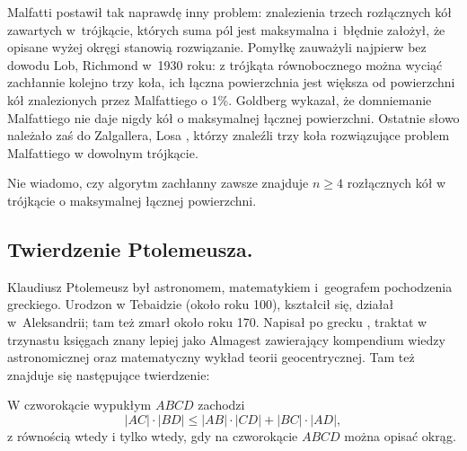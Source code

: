 Malfatti postawił tak naprawdę inny problem: znalezienia trzech rozłącznych kół zawartych w~trójkącie, których suma pól jest maksymalna i~błędnie założył, że opisane wyżej okręgi stanowią rozwiązanie.
Pomyłkę zauważyli najpierw bez dowodu Lob, Richmond \cite{lob_richmond_1930} w~1930 roku: z trójkąta równobocznego można wyciąć zachłannie kolejno trzy koła, ich łączna powierzchnia jest większa od powierzchni kół znalezionych przez Malfattiego o 1\%.
%
%
Goldberg \cite{goldberg_1967} wykazał, że domniemanie Malfattiego nie daje nigdy kół o maksymalnej łącznej powierzchni.
Ostatnie słowo należało zaś do Zalgallera, Losa \cite{zalgaller_los_1992}, którzy znaleźli trzy koła rozwiązujące problem Malfattiego w dowolnym trójkącie.
%
%

Nie wiadomo, czy algorytm zachłanny zawsze znajduje $n \ge 4$ rozłącznych kół w trójkącie o maksymalnej łącznej powierzchni.

%



%



%

\subsection{Twierdzenie Ptolemeusza.}
Klaudiusz Ptolemeusz był astronomem, matematykiem i~geografem pochodzenia greckiego.
Urodzon w Tebaidzie (około roku 100), kształcił się, działał w~Aleksandrii; tam też zmarł około roku 170.
Napisał po grecku %
, traktat w trzynastu księgach znany lepiej jako Almagest zawierający kompendium wiedzy astronomicznej oraz matematyczny wykład teorii geocentrycznej.
Tam też znajduje się następujące twierdzenie:

\begin{theorem}[Ptolemeusza, 140]
    W czworokącie wypukłym $ABCD$ zachodzi
    \begin{equation}
        |AC| \cdot |BD| \le |AB| \cdot |CD| + |BC| \cdot |AD|,
    \end{equation}
    z równością wtedy i tylko wtedy, gdy na czworokącie $ABCD$ można opisać okrąg.
\end{theorem}

